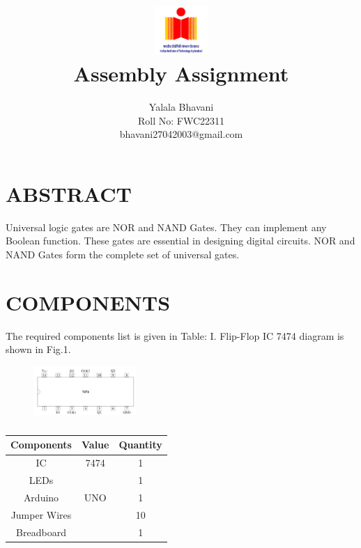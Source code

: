 \documentclass[conference]{IEEEtran}
\title{
\vspace{1cm}
{\includegraphics[width=0.15\textwidth]{Fig1} \\ Assembly Assignment} }
\author{Yalala Bhavani \\ Roll No: FWC22311 \\ bhavani27042003@gmail.com}
\begin{document}
\maketitle
 \section {ABSTRACT}
 Universal logic gates are NOR and NAND Gates.
They can implement any Boolean function.
These gates are essential in designing digital circuits.
NOR and NAND Gates form the complete set of universal gates.
\section{COMPONENTS}
The required components list is given in Table: I. Flip-Flop IC 7474 diagram is shown in Fig.1.
\begin{figure}[h]
\centering
\includegraphics[width=0.35\textwidth]{Fig2}
\caption{\label{fig:Gates}}
\end{figure}
 \begin{table} [htbp]
\centering
\begin{tabular}{| c | c | c |} \hline
Components & Value & Quantity \\\hline
IC & 7474 & 1 \\ \hline
LEDs &  & 1 \\ \hline
Arduino & UNO & 1 \\ \hline
Jumper Wires &  & 10 \\ \hline
Breadboard & & 1 \\ 
\hline
\end{tabular}
\vspace{0.1cm}
\caption{\label{tab:widgets}}
\end{table}
\end{document}
